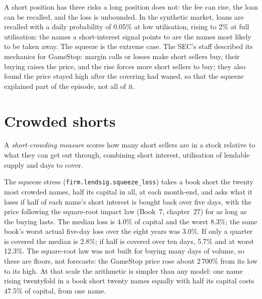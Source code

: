 A short position has three risks a long position does not: the fee can rise, the loan can be recalled, and the loss is unbounded. In the synthetic market,
loans are recalled with a daily probability of 0.05\% at low utilisation, rising to 2\% at full utilisation: the names a short-interest signal points to are
the names most likely to be taken away. The squeeze is the extreme case. The SEC's staff described its mechanics for GameStop: margin calls or losses make
short sellers buy, their buying raises the price, and the rise forces more short sellers to buy; they also found the price stayed high after the covering
had waned, so that the squeeze explained part of the episode, not all of it.

\section{Crowded shorts}

\begin{definition}\label{def:s1:short-interest-borrow-and-crowding:crowding}
A \emph{short-crowding measure} scores how many short sellers are in a stock relative to what they can get out through,
combining short interest, utilisation of lendable supply and days to cover.
\end{definition}

The squeeze stress (\texttt{firm.lendsig.squeeze\_loss}) takes a book short the twenty most crowded
names, half its capital in all, at each month-end, and asks what it loses if half of each name's short interest is bought back over five days, with the
price following the square-root impact law (Book~7, chapter~27) for as long as the buying lasts. The median loss is 4.0\% of capital and the worst 8.3\%;
the same book's worst actual five-day loss over the eight years was 3.0\%. If only a quarter is covered the median is 2.8\%; if half is covered over ten
days, 5.7\% and at worst 12.3\%. The square-root law was not built for buying many days of volume, so these are floors, not forecasts: the GameStop price
rose about 2\,700\% from its low to its high. At that scale the arithmetic is simpler than any model: one name rising twentyfold in a book short twenty names
equally with half its capital costs 47.5\% of capital, from one name.

